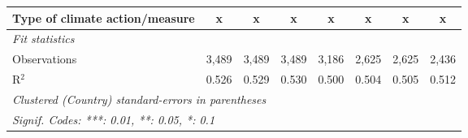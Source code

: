 \begin{table}[htbp]
\begin{tabular}{lccccccc}
      Type of climate action/measure                                     & x              & x             & x              & x             & x             & x             & x\\  
      \midrule \emph{Fit statistics}\\
      Observations                                                       & 3,489          & 3,489         & 3,489          & 3,186         & 2,625         & 2,625         & 2,436\\  
      R$^2$                                                              & 0.526          & 0.529         & 0.530          & 0.500         & 0.504         & 0.505         & 0.512\\  
      \midrule
      \multicolumn{8}{l}{\emph{Clustered (Country) standard-errors in parentheses}}\\
      \multicolumn{8}{l}{\emph{Signif. Codes: ***: 0.01, **: 0.05, *: 0.1}}\\
   \end{tabular}
\end{table}


